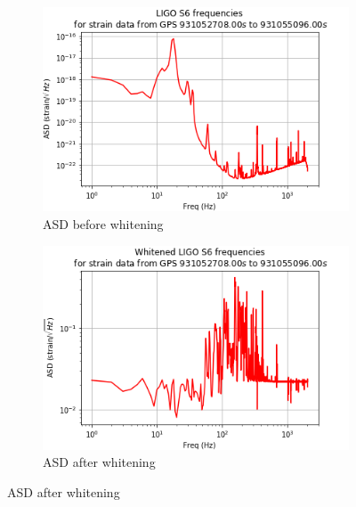\documentclass{article}
\begin{document}
\begin{figure}
\begin{subfigure}[t]{0.5\textwidth}
\includegraphics[width=\textwidth]{noise.png}
\caption{ASD before whitening}
\label{fig:prewhite}
\end{subfigure}
\begin{subfigure}[t]{0.5\textwidth}
\includegraphics[width=\textwidth]{white.png}
\caption{ASD after whitening}
\label{fig:postwhite}
\end{subfigure}


\end{figure}
\end{document}
